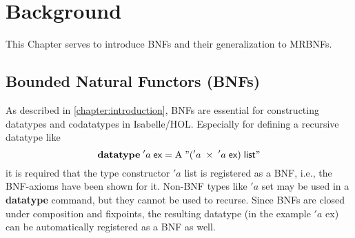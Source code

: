 
\chapter{Background}
\label{chapter:background}

  This Chapter serves to introduce \acp{BNF} and their generalization to \acp{MRBNF}. 
  \section{Bounded Natural Functors (BNFs)}
    As described in \autoref{chapter:introduction}, \acp{BNF} are essential for constructing datatypes and codatatypes in Isabelle/HOL. Especially for defining a recursive datatype like 
    \begin{equation*}
      \textbf{datatype}\; 'a\; \textsf{ex} = \text{A}\; "('a\; \times\; 'a\; \textsf{ex})\; \textsf{list}"
    \end{equation*}
    it is required that the type constructor \textsf{$'a$ list} is registered as a \ac{BNF}, i.e., the \ac{BNF}-axioms have been shown for it. Non-\ac{BNF} types like \textsf{$'a$ set} may be used in a \textbf{datatype} command, but they cannot be used to recurse. Since \acp{BNF} are closed under composition and fixpoints, the resulting datatype (in the example \textsf{$'a$ ex}) can be automatically registered as a \ac{BNF} as well.

